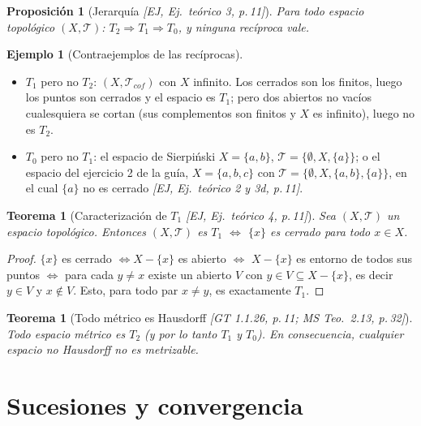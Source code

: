\documentclass[11pt,a4paper]{article}
\theoremstyle{definition}
\newtheorem{ejemplo}[definicion]{Ejemplo}
\theoremstyle{plain}
\newtheorem{teorema}[definicion]{Teorema}
\newtheorem{proposicion}[definicion]{Proposición}
\newcommand{\fnt}[1]{{\normalfont\small\itshape\color{gray!150!black}[#1]}}
\newcommand{\tp}{\mathcal{T}}
\begin{document}
\begin{proposicion}[Jerarquía \fnt{EJ, Ej.\ teórico 3, p.\,11}]
Para todo espacio topológico $(X,\tp)$: $T_2\Rightarrow T_1\Rightarrow T_0$, y ninguna recíproca vale.
\end{proposicion}

\begin{ejemplo}[Contraejemplos de las recíprocas]
\begin{itemize}[leftmargin=1.4em,itemsep=1pt]
\item $T_1$ pero no $T_2$: $(X,\tp_{cof})$ con $X$ infinito. Los cerrados son los finitos, luego los puntos son cerrados y el espacio es $T_1$; pero dos abiertos no vacíos cualesquiera se cortan (sus complementos son finitos y $X$ es infinito), luego no es $T_2$.
\item $T_0$ pero no $T_1$: el espacio de Sierpi\'nski $X=\{a,b\}$, $\tp=\{\emptyset,X,\{a\}\}$; o el espacio del ejercicio 2 de la guía, $X=\{a,b,c\}$ con $\tp=\{\emptyset,X,\{a,b\},\{a\}\}$, en el cual $\{a\}$ no es cerrado \fnt{EJ, Ej.\ teórico 2 y 3d, p.\,11}.
\end{itemize}
\end{ejemplo}

\begin{teorema}[Caracterización de $T_1$ \fnt{EJ, Ej.\ teórico 4, p.\,11}]
Sea $(X,\tp)$ un espacio topológico. Entonces $(X,\tp)$ es $T_1$ $\iff$ $\{x\}$ es cerrado para todo $x\in X$.
\end{teorema}

\begin{proof}
$\{x\}$ es cerrado $\iff X-\{x\}$ es abierto $\iff$ $X-\{x\}$ es entorno de todos sus puntos $\iff$ para cada $y\ne x$ existe un abierto $V$ con $y\in V\subseteq X-\{x\}$, es decir $y\in V$ y $x\notin V$. Esto, para todo par $x\ne y$, es exactamente $T_1$.
\end{proof}

\begin{teorema}[Todo métrico es Hausdorff \fnt{GT 1.1.26, p.\,11; MS Teo.\ 2.13, p.\,32}]
Todo espacio métrico es $T_2$ (y por lo tanto $T_1$ y $T_0$). En consecuencia, cualquier espacio no Hausdorff no es metrizable.
\end{teorema}

\section{Sucesiones y convergencia}\label{sec:suc}
\end{document}
